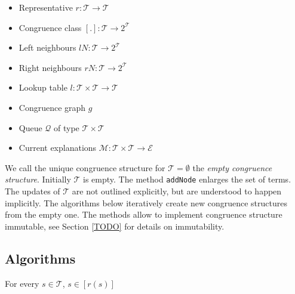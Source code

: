 \begin{itemize}
	\item Representative $r: \mathcal{T} \rightarrow \mathcal{T}$
	\item Congruence class $[.]: \mathcal{T} \rightarrow 2^\mathcal{T}$
	\item Left neighbours $lN: \mathcal{T} \rightarrow 2^\mathcal{T}$
	\item Right neighbours $rN: \mathcal{T} \rightarrow 2^\mathcal{T}$
	\item Lookup table $l: \mathcal{T} \times \mathcal{T} \rightarrow \mathcal{T}$
	\item Congruence graph $g$
	\item Queue $\mathcal{Q}$ of type $\mathcal{T} \times \mathcal{T}$
	\item Current explanations $\mathcal{M}: \mathcal{T} \times \mathcal{T} \rightarrow \mathcal{E}$
\end{itemize}

We call the unique congruence structure for $\mathcal{T} = \emptyset$ the \emph{empty congruence structure}.
Initially $\mathcal{T}$ is empty.
The method \texttt{addNode} enlarges the set of terms.
The updates of $\mathcal{T}$ are not outlined explicitly, but are understood to happen implicitly.
The algorithms below iteratively create new congruence structures from the empty one.
The methods allow to implement congruence structure immutable, see Section \ref{TODO} for details on immutability.

\subsection*{Algorithms}













\begin{invariant}

For every $s \in \mathcal{T}$, $s \in [r(s)]$
\label{invar:class}
\end{invariant}

